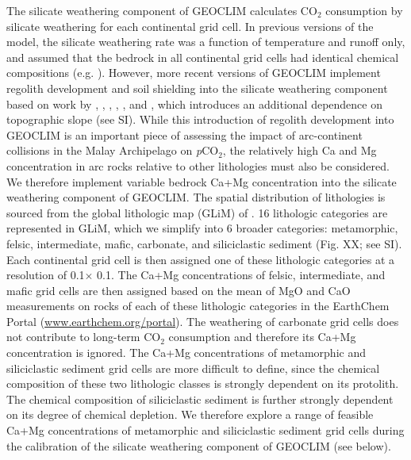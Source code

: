 \documentclass[11pt,letterpaper]{article}
\newcommand{\degrees}{\textdegree\xspace}
\newcommand{\pCOtwo}{\textit{p}CO$_{2}$\xspace}
\newcommand{\COtwo}{CO$_{2}$\xspace}
\begin{document}
The silicate weathering component of GEOCLIM calculates \COtwo consumption by silicate weathering for each continental grid cell. In previous versions of the model, the silicate weathering rate was a function of temperature and runoff only, and assumed that the bedrock in all continental grid cells had identical chemical compositions (e.g. \citealp{Godderis2014a}). However, more recent versions of GEOCLIM implement regolith development and soil shielding into the silicate weathering component based on work by \citet{Heimsath1997a}, \citet{Gabet2009a}, \citet{West2012a}, \citet{Carretier2014a}, \citet{Godderis2017b}, and \citet{Maffre2018a}, which introduces an additional dependence on topographic slope (see SI). While this introduction of regolith development into GEOCLIM is an important piece of assessing the impact of arc-continent collisions in the Malay Archipelago on \pCOtwo, the relatively high Ca and Mg concentration in arc rocks relative to other lithologies must also be considered. We therefore implement variable bedrock Ca+Mg concentration into the silicate weathering component of GEOCLIM. The spatial distribution of lithologies is sourced from the global lithologic map (GLiM) of \citet{Hartmann2012a}. 16 lithologic categories are represented in GLiM, which we simplify into 6 broader categories: metamorphic, felsic, intermediate, mafic, carbonate, and siliciclastic sediment (Fig. XX; see SI). Each continental grid cell is then assigned one of these lithologic categories at a resolution of 0.1\degrees $\times$ 0.1\degrees. The Ca+Mg concentrations of felsic, intermediate, and mafic grid cells are then assigned based on the mean of MgO and CaO measurements on rocks of each of these lithologic categories in the EarthChem Portal (\url{www.earthchem.org/portal}). The weathering of carbonate grid cells does not contribute to long-term \COtwo consumption and therefore its Ca+Mg concentration is ignored. The Ca+Mg concentrations of metamorphic and siliciclastic sediment grid cells are more difficult to define, since the chemical composition of these two lithologic classes is strongly dependent on its protolith. The chemical composition of siliciclastic sediment is further strongly dependent on its degree of chemical depletion. We therefore explore a range of feasible Ca+Mg concentrations of metamorphic and siliciclastic sediment grid cells during the calibration of the silicate weathering component of GEOCLIM (see below).
\end{document}
